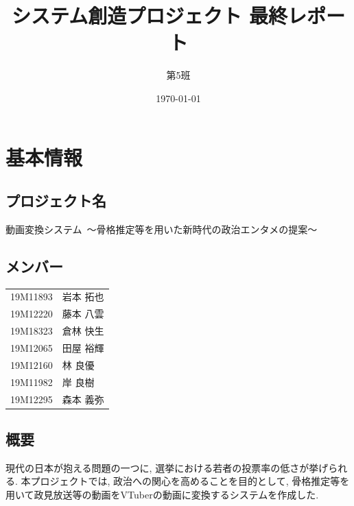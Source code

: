 \documentclass[a4paper,12pt]{jsarticle}
\title{システム創造プロジェクト 最終レポート}
\author{第5班}
\date{\today}
\begin{document}
\maketitle

\section{基本情報}
\subsection{プロジェクト名}
{\large 動画変換システム\ 〜骨格推定等を用いた新時代の政治エンタメの提案〜}

\subsection{メンバー}
\begin{table}[H]
    \begin{tabular}{cl}
        19M11893 & 岩本 拓也\\
        19M12220 & 藤本 八雲\\
        19M18323 & 倉林 快生\\
        19M12065 & 田屋 裕輝\\
        19M12160 & 林 良優\\
        19M11982 & 岸 良樹\\
        19M12295 & 森本 義弥
	\end{tabular}
\end{table}

\subsection{概要}

現代の日本が抱える問題の一つに, 選挙における若者の投票率の低さが挙げられる.
本プロジェクトでは, 政治への関心を高めることを目的として, 骨格推定等を用いて政見放送等の動画をVTuberの動画に変換するシステムを作成した.
\end{document}
